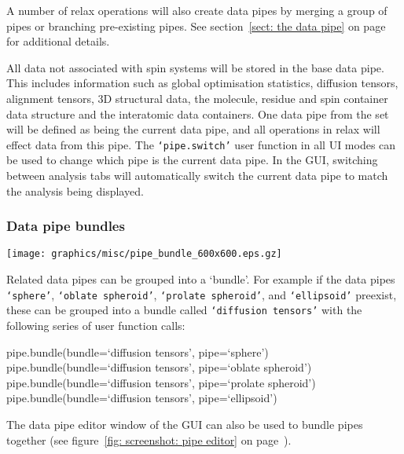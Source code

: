 
A number of relax operations will also create data pipes by merging a group of pipes or branching pre-existing pipes.  See section~\ref{sect: the data pipe} on page~\pageref{sect: the data pipe} for additional details.

All data not associated with spin systems will be stored in the base data pipe.  This includes information such as global optimisation statistics, diffusion tensors, alignment tensors, 3D structural data, the molecule, residue and spin container data structure and the interatomic data containers.  One data pipe from the set will be defined as being the current data pipe, and all operations in relax will effect data from this pipe.  The \texttt{`pipe.switch'} user function in all UI modes can be used to change which pipe is the current data pipe.  In the GUI, switching between analysis tabs will automatically switch the current data pipe to match the analysis being displayed.


\subsubsection{Data pipe bundles}

\begin{figure*}[h]
\texttt{[image: graphics/misc/pipe\_bundle\_600x600.eps.gz]}
\end{figure*}

Related data pipes can be grouped into a `bundle'.  For example if the data pipes \texttt{`sphere'}, \texttt{`oblate spheroid'}, \texttt{`prolate spheroid'}, and \texttt{`ellipsoid'} preexist, these can be grouped into a bundle called \texttt{`diffusion tensors'} with the following series of user function calls:

\begin{exampleenv}
pipe.bundle(bundle=`diffusion tensors', pipe=`sphere') \\
pipe.bundle(bundle=`diffusion tensors', pipe=`oblate spheroid') \\
pipe.bundle(bundle=`diffusion tensors', pipe=`prolate spheroid') \\
pipe.bundle(bundle=`diffusion tensors', pipe=`ellipsoid')
\end{exampleenv}

The data pipe editor window of the GUI can also be used to bundle pipes together (see figure~\ref{fig: screenshot: pipe editor} on page~\pageref{fig: screenshot: pipe editor}).




